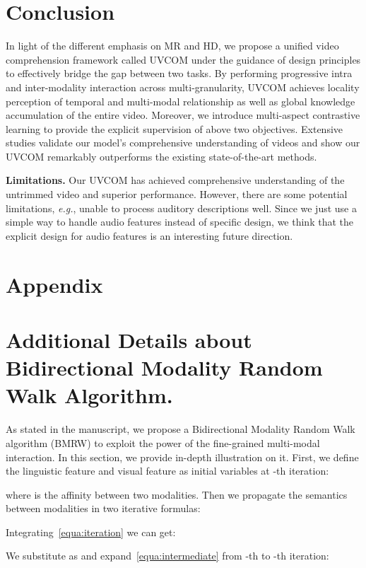 \documentclass[10pt,twocolumn,letterpaper]{article}
\begin{document}
\section{Conclusion}
In light of the different emphasis on MR and HD, we propose a unified video comprehension framework called UVCOM under the guidance of design principles to effectively bridge the gap between two tasks.
By performing progressive intra and inter-modality interaction across multi-granularity, UVCOM achieves locality perception of temporal and multi-modal relationship as well as global knowledge accumulation of the entire video.
Moreover, we introduce multi-aspect contrastive learning to provide the explicit supervision of above two objectives. 
Extensive studies validate our model’s comprehensive understanding of videos and show our UVCOM remarkably outperforms the existing state-of-the-art methods.

\noindent \textbf{Limitations.} Our UVCOM has achieved comprehensive understanding of the untrimmed video and superior performance.
However, there are some potential limitations, \textit{e.g.}, unable to process auditory descriptions well.
Since we just use a simple way to handle audio features instead of specific design, we think that the explicit design for audio features is an interesting future direction.

 {
    \small
    
    
}
\clearpage
\setcounter{page}{1}
\appendix
\section*{\large Appendix}
\section{Additional Details about Bidirectional Modality Random Walk Algorithm.}
As stated in the manuscript, we propose a Bidirectional Modality Random Walk algorithm (BMRW) to exploit the power of the fine-grained multi-modal interaction. In this section, we provide in-depth illustration on it. First, we define the linguistic feature  and visual feature  as initial variables at -th iteration:

where  is the affinity between two modalities.
Then we propagate the semantics between modalities in two iterative formulas:

Integrating~\cref{equa:iteration} we can get:

We substitute  as  and expand~\cref{equa:intermediate} from -th to -th iteration:
\end{document}
